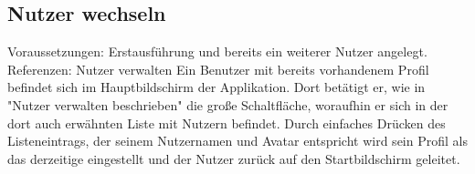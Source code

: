 \subsection{Nutzer wechseln}
Voraussetzungen: Erstausführung und bereits ein weiterer Nutzer angelegt.\newline
Referenzen: Nutzer verwalten
\newline
\newline
Ein Benutzer mit bereits vorhandenem Profil befindet sich im Hauptbildschirm 
der Applikation. Dort betätigt er, wie in "Nutzer verwalten beschrieben" die
große Schaltfläche, woraufhin er sich in der dort auch erwähnten Liste
mit Nutzern befindet. Durch einfaches Drücken des Listeneintrags, der
seinem Nutzernamen und Avatar entspricht wird sein Profil als das derzeitige 
eingestellt und der Nutzer zurück auf den Startbildschirm geleitet.
